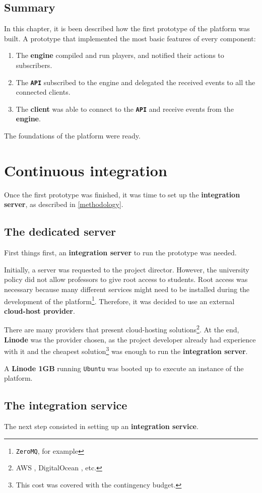 \documentclass[a4paper,11pt,titlepage,abstract,numbers=noenddot,automark,mnsy,intlimits,rgb,dvipsnames]{report}
\begin{document}
\section{Summary}
In this chapter, it is been described how the first prototype of the platform was built. A prototype that implemented the
most basic features of every component:
\begin{enumerate}
\item
The \textbf{engine} compiled and run players, and notified their actions to subscribers.
\item
The \textbf{\texttt{API}} subscribed to the engine and delegated the received events to all the connected clients.
\item
The \textbf{client} was able to connect to the \textbf{\texttt{API}} and receive events from the \textbf{engine}.
\end{enumerate}
The foundations of the platform were ready.
\chapter{Continuous integration}
Once the first prototype was finished, it was time to set up the \textbf{integration server}, as described in
\autoref{methodology}.
\section{The dedicated server}
First things first, an \textbf{integration server} to run the prototype was needed.

Initially, a server was requested to the project director. However, the university policy did not allow professors
to give root access to students. Root access was necessary because many different services might need to be installed during the
development of the platform\footnote{\texttt{ZeroMQ}, for example}. Therefore, it was decided to use an external \textbf{cloud-host provider}.

There are many providers that present cloud-hosting solutions\footnote{AWS \cite{aws}, DigitalOcean \cite{digital_ocean}, etc.}.
At the end, \textbf{Linode} \cite{linode} was the provider chosen, as the project developer already had experience with it and
the cheapest solution\footnote{This cost was covered with the contingency budget.} was enough to run the \textbf{integration server}.

A \textbf{Linode 1GB} \cite{linode} running \texttt{Ubuntu} was booted up to execute an
instance of the platform.
\section{The integration service}
The next step consisted in setting up an \textbf{integration service}.
\end{document}
